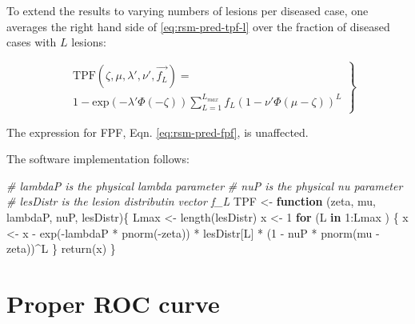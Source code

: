 \documentclass[
]{book}
\newenvironment{Shaded}{\begin{snugshade}}{\end{snugshade}}
\newcommand{\CommentTok}[1]{\textcolor[rgb]{0.56,0.35,0.01}{\textit{#1}}}
\newcommand{\ControlFlowTok}[1]{\textcolor[rgb]{0.13,0.29,0.53}{\textbf{#1}}}
\newcommand{\DecValTok}[1]{\textcolor[rgb]{0.00,0.00,0.81}{#1}}
\newcommand{\FunctionTok}[1]{\textcolor[rgb]{0.00,0.00,0.00}{#1}}
\newcommand{\NormalTok}[1]{#1}
\newcommand{\OtherTok}[1]{\textcolor[rgb]{0.56,0.35,0.01}{#1}}
\newcommand{\SpecialCharTok}[1]{\textcolor[rgb]{0.00,0.00,0.00}{#1}}
\begin{document}
To extend the results to varying numbers of lesions per diseased case, one averages the right hand side of \eqref{eq:rsm-pred-tpf-l} over the fraction of diseased cases with \(L\) lesions:

\begin{equation}
\left.
\begin{aligned}
& \text{TPF}\left (\zeta , \mu, \lambda', \nu', \overrightarrow{f_L} \right ) =  \\
& 1 - \text{exp}\left ( -\lambda' \Phi \left ( -\zeta \right )\right ) 
\sum_{L=1}^{L_{max}} f_L  \left ( 1 - \nu' \Phi \left ( \mu -\zeta \right ) \right )^L 
\end{aligned}
\right \}
\label{eq:rsm-pred-tpf}
\end{equation}

The expression for FPF, Eqn. \eqref{eq:rsm-pred-fpf}, is unaffected.

The software implementation follows:

\begin{Shaded}
\begin{Highlighting}[]
\CommentTok{\# lambdaP is the physical lambda\textquotesingle{} parameter}
\CommentTok{\# nuP is the physical nu\textquotesingle{} parameter}
\CommentTok{\# lesDistr is the lesion distributin vector f\_L}
\NormalTok{TPF }\OtherTok{\textless{}{-}} \ControlFlowTok{function}\NormalTok{ (zeta, mu, lambdaP, nuP, lesDistr)\{}
\NormalTok{  Lmax }\OtherTok{\textless{}{-}} \FunctionTok{length}\NormalTok{(lesDistr)}
\NormalTok{  x }\OtherTok{\textless{}{-}} \DecValTok{1}
  \ControlFlowTok{for}\NormalTok{ (L }\ControlFlowTok{in} \DecValTok{1}\SpecialCharTok{:}\NormalTok{Lmax ) \{}
\NormalTok{    x }\OtherTok{\textless{}{-}}\NormalTok{ x }\SpecialCharTok{{-}} \FunctionTok{exp}\NormalTok{(}\SpecialCharTok{{-}}\NormalTok{lambdaP }\SpecialCharTok{*} \FunctionTok{pnorm}\NormalTok{(}\SpecialCharTok{{-}}\NormalTok{zeta)) }\SpecialCharTok{*}\NormalTok{ lesDistr[L] }\SpecialCharTok{*}\NormalTok{ (}\DecValTok{1} \SpecialCharTok{{-}}\NormalTok{ nuP }\SpecialCharTok{*} \FunctionTok{pnorm}\NormalTok{(mu }\SpecialCharTok{{-}}\NormalTok{ zeta))}\SpecialCharTok{\^{}}\NormalTok{L}
\NormalTok{  \}}
  \FunctionTok{return}\NormalTok{(x)}
\NormalTok{\}}
\end{Highlighting}
\end{Shaded}

\hypertarget{rsm-pred-roc-curve-proper}{%
\section{Proper ROC curve}\label{rsm-pred-roc-curve-proper}}
\end{document}
